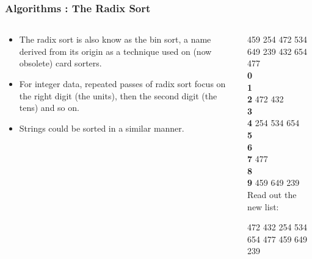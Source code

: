 \begin{frame}[fragile]
\frametitle{Algorithms : The Radix Sort}
\begin{columns}[T]

\begin{column}{0.45\textwidth}
\begin{itemize}[<+->]
\item The radix sort is also know as the bin sort, a name derived from its origin as a technique used on (now obsolete) card sorters.
\item For integer data, repeated passes of radix sort focus on the right digit (the units), then the second digit (the tens)
and so on.
\item Strings could be sorted in a similar manner.
\end{itemize}
\end{column}

\pause
\begin{column}{0.45\textwidth}
459 254 472 534 649 239 432 654 477\\
\vspace*{1em}
{\bf 0}\\
{\bf 1}\\
{\bf 2} 472 432\\
{\bf 3}\\
{\bf 4} 254 534 654\\
{\bf 5}\\
{\bf 6}\\
{\bf 7} 477\\
{\bf 8}\\
{\bf 9} 459 649 239\\
\vspace*{1em}
Read out the new list:

472 432 254 534 654 477 459 649 239
\end{column}

\end{columns}
\end{frame}



